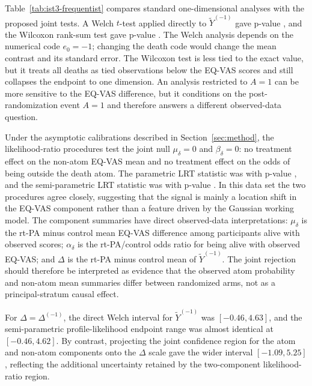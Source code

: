 \documentclass[11pt]{article}
\begin{document}
Table~\ref{tab:ist3-frequentist} compares standard one-dimensional analyses with the proposed joint tests. A Welch $t$-test applied directly to $\widetilde{Y}^{(-1)}$ gave p-value \ApplicationTTestP{}, and the Wilcoxon rank-sum test gave p-value \ApplicationWilcoxP{}. The Welch analysis depends on the numerical code $e_0=-1$; changing the death code would change the mean contrast and its standard error. The Wilcoxon test is less tied to the exact value, but it treats all deaths as tied observations below the EQ-VAS scores and still collapses the endpoint to one dimension. An analysis restricted to $A=1$ can be more sensitive to the EQ-VAS difference, but it conditions on the post-randomization event $A=1$ and therefore answers a different observed-data question.



Under the asymptotic calibrations described in Section~\ref{sec:method}, the likelihood-ratio procedures test the joint null $\mu_\delta=0$ and $\beta_\delta=0$: no treatment effect on the non-atom EQ-VAS mean and no treatment effect on the odds of being outside the death atom. The parametric LRT statistic was \ApplicationLRTStatistic{} with p-value \ApplicationLRTP{}, and the semi-parametric LRT statistic was \ApplicationSPLRTStatistic{} with p-value \ApplicationSPLRTP{}. In this data set the two procedures agree closely, suggesting that the signal is mainly a location shift in the EQ-VAS component rather than a feature driven by the Gaussian working model. The component summaries have direct observed-data interpretations: $\mu_\delta$ is the rt-PA minus control mean EQ-VAS difference among participants alive with observed scores; $\alpha_\delta$ is the rt-PA/control odds ratio for being alive with observed EQ-VAS; and $\Delta$ is the rt-PA minus control mean of $\widetilde{Y}^{(-1)}$. The joint rejection should therefore be interpreted as evidence that the observed atom probability and non-atom mean summaries differ between randomized arms, not as a principal-stratum causal effect.

For $\Delta=\Delta^{(-1)}$, the direct Welch interval for $\widetilde{Y}^{(-1)}$ was $[-0.46, 4.63]$, and the semi-parametric profile-likelihood endpoint range was almost identical at $[-0.46, 4.62]$. By contrast, projecting the joint confidence region for the atom and non-atom components onto the $\Delta$ scale gave the wider interval $[-1.09, 5.25]$, reflecting the additional uncertainty retained by the two-component likelihood-ratio region.
\end{document}
